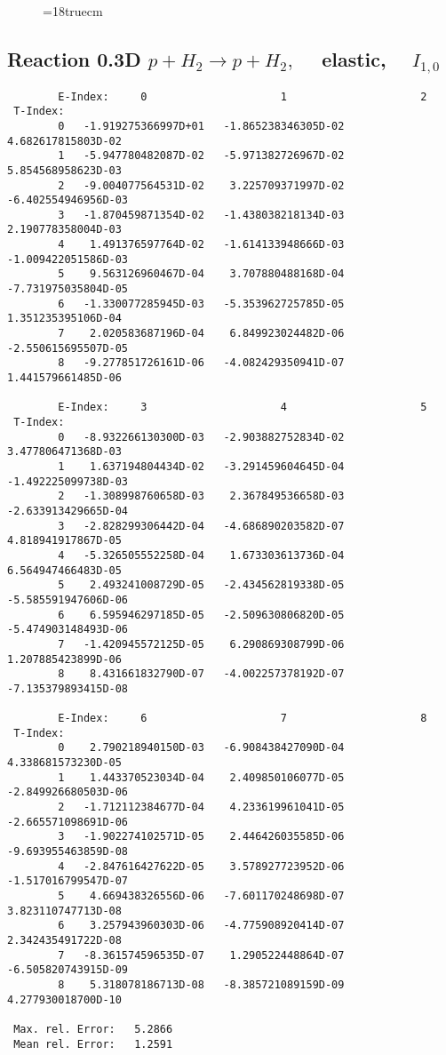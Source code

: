 \begin{figure} \label{0.3T}
\epsfxsize=18truecm
\end{figure}
\newpage


\subsection{
Reaction 0.3D  $p + H_2 \rightarrow  p + H_2 ,\quad$  elastic,
$\quad I_{1,0}$
}

\begin{verbatim}
        E-Index:     0                     1                     2
 T-Index:
        0   -1.919275366997D+01   -1.865238346305D-02    4.682617815803D-02
        1   -5.947780482087D-02   -5.971382726967D-02    5.854568958623D-03
        2   -9.004077564531D-02    3.225709371997D-02   -6.402554946956D-03
        3   -1.870459871354D-02   -1.438038218134D-03    2.190778358004D-03
        4    1.491376597764D-02   -1.614133948666D-03   -1.009422051586D-03
        5    9.563126960467D-04    3.707880488168D-04   -7.731975035804D-05
        6   -1.330077285945D-03   -5.353962725785D-05    1.351235395106D-04
        7    2.020583687196D-04    6.849923024482D-06   -2.550615695507D-05
        8   -9.277851726161D-06   -4.082429350941D-07    1.441579661485D-06

        E-Index:     3                     4                     5
 T-Index:
        0   -8.932266130300D-03   -2.903882752834D-02    3.477806471368D-03
        1    1.637194804434D-02   -3.291459604645D-04   -1.492225099738D-03
        2   -1.308998760658D-03    2.367849536658D-03   -2.633913429665D-04
        3   -2.828299306442D-04   -4.686890203582D-07    4.818941917867D-05
        4   -5.326505552258D-04    1.673303613736D-04    6.564947466483D-05
        5    2.493241008729D-05   -2.434562819338D-05   -5.585591947606D-06
        6    6.595946297185D-05   -2.509630806820D-05   -5.474903148493D-06
        7   -1.420945572125D-05    6.290869308799D-06    1.207885423899D-06
        8    8.431661832790D-07   -4.002257378192D-07   -7.135379893415D-08

        E-Index:     6                     7                     8
 T-Index:
        0    2.790218940150D-03   -6.908438427090D-04    4.338681573230D-05
        1    1.443370523034D-04    2.409850106077D-05   -2.849926680503D-06
        2   -1.712112384677D-04    4.233619961041D-05   -2.665571098691D-06
        3   -1.902274102571D-05    2.446426035585D-06   -9.693955463859D-08
        4   -2.847616427622D-05    3.578927723952D-06   -1.517016799547D-07
        5    4.669438326556D-06   -7.601170248698D-07    3.823110747713D-08
        6    3.257943960303D-06   -4.775908920414D-07    2.342435491722D-08
        7   -8.361574596535D-07    1.290522448864D-07   -6.505820743915D-09
        8    5.318078186713D-08   -8.385721089159D-09    4.277930018700D-10

 Max. rel. Error:   5.2866
 Mean rel. Error:   1.2591
\end{verbatim}


